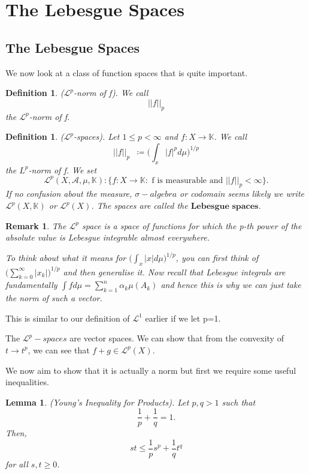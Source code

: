 \documentclass[twoside]{article}
\newtheorem{lemma}[theorem]{Lemma}
\newtheorem{remark}[theorem]{Remark}
\newtheorem{definition}[theorem]{Definition}
\newcommand{\sa}{\sigma-algebra}
\begin{document}
\section{The Lebesgue Spaces}
\subsection{The Lebesgue Spaces}
We now look at a class of function spaces that is quite important. 

\begin{definition}($\mathcal{L}^p$-norm of f). We call
$$
||f||_p
$$
the $\mathcal{L}^p$-norm of f.
\end{definition}

\begin{definition}($\mathcal{L}^p$-spaces). Let $1 \leq p < \infty$ and $f: X \rightarrow \mathbb{K}$. We call
$$
||f||_p \;\;\coloneqq \big(\int_x|f|^pd\mu\big)^{1/p}
$$ 
the $L^p$-norm of f. We set
$$
\mathcal{L}^p(X,\mathcal{A},\mu,\mathbb{K}) : \{f: X \rightarrow \mathbb{K}: \text{ f is measurable and } ||f||_p < \infty\}.
$$
If no confusion about the measure, $\sa$ or codomain seems likely we write $\mathcal{L}^p(X,\mathbb{K})$ or $\mathcal{L}^p(X)$. The spaces are called the $\textbf{Lebesgue spaces}$.
\end{definition}

\begin{remark}The $\mathcal{L}^p$ space is a space of functions for which the p-th power of the absolute value is Lebesgue integrable almost everywhere.

To think about what it means for $\big(\int_x|x|d\mu \big)^{1/p}$, you can first think of $\big(\sum_{k=0}^{\infty}|x_k|\big)^{1/p}$ and then generalise it. Now recall that Lebesgue integrals are fundamentally $\int fd\mu = \sum_{k=1}^n\alpha_k\mu(A_k)$ and hence this is why we can just take the norm of such a vector.
\end{remark}

This is similar to our definition of $\mathcal{L}^1$ earlier if we let p=1.

The $\mathcal{L}^p-spaces$ are vector spaces. We can show that from the convexity of $t \rightarrow t^p$, we can see that $f + g \in \mathcal{L}^p(X)$.

We now aim to show that it is actually a norm but first we require some useful inequalities.

\begin{lemma}(Young's Inequality for Products). Let $p,q > 1$ such that
$$
\frac{1}{p} + \frac{1}{q} = 1.
$$
Then, 
$$
st \leq \frac{1}{p}s^p + \frac{1}{q}t^q
$$
for all $s,t \geq 0$.
\end{lemma}
\end{document}
